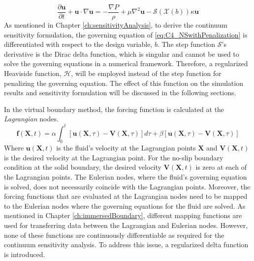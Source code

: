 %
\begin{equation}\label{eq:C4_NSwithPenalization}
    \frac{\partial \mathbf{u}}{\partial t} + \mathbf{u} \cdot \nabla \mathbf{u} = 
    -\frac{\nabla P}{\rho} + \mu \nabla^2 \mathbf{u} -\mathcal{S}(\mathcal{X}(b)) \kappa \mathbf{u}
\end{equation}
%
As mentioned in Chapter \ref{ch:sensitivityAnalysis}, to derive the continuum sensitivity formulation, the governing equation of \eqref{eq:C4_NSwithPenalization} is differentiated with respect to the design variable, $b$. The step function $\mathcal{S}$'s derivative is the Dirac delta function, which is singular and cannot be used to solve the governing equations in a numerical framework. Therefore, a regularized Heaviside function, $\mathcal{H}$, will be employed instead of the step function for penalizing the governing equation. The effect of this function on the simulation results and sensitivity formulation will be discussed in the following sections.

In the virtual boundary method, the forcing function is calculated at the \emph{Lagrangian} nodes.
%
\begin{equation}\label{eq:C3_feedbackForcingFunction}
    \mathbf{f}(\mathbf{X}, t) = 
    \alpha \int_0^t \left[ \mathbf{u}(\mathbf{X}, \tau) - \mathbf{V}(\mathbf{X}, \tau) \right] d\tau + 
    \beta \left[ \mathbf{u}(\mathbf{X}, \tau) - \mathbf{V}(\mathbf{X}, \tau) \right]
\end{equation}
%
Where $\mathbf{u}(\mathbf{X}, t)$ is the fluid's velocity at the Lagrangian points $\mathbf{X}$ and $\mathbf{V}(\mathbf{X}, t)$ is the desired velocity at the Lagrangian point. For the no-slip boundary condition at the solid boundary, the desired velocity $\mathbf{V}(\mathbf{X}, t)$ is zero at each of the Lagrangian points. The Eulerian nodes, where the fluid's governing equation is solved, does not necessarily coincide with the Lagrangian points. Moreover, the forcing functions that are evaluated at the Lagrangian nodes need to be mapped to the Eulerian nodes where the governing equations for the fluid are solved. As mentioned in Chapter \ref{ch:immersedBoundary}, different mapping functions are used for transferring data between the Lagrangian and Eulerian nodes. However, none of these functions are continuously differentiable as required for the continuum sensitivity analysis. To address this issue, a regularized delta function is introduced.
